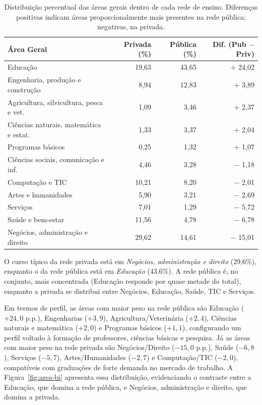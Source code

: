 \documentclass[12pt]{article}
\begin{document}
\begin{table}[h]
\centering
\small
\begin{tabular}{lrrr}
\toprule
Área Geral & Privada (\%) & Pública (\%) & Dif. (Pub $-$ Priv) \\
\midrule
Educação & 19,63 & 43,65 & $+$ 24,02 \\
Engenharia, produção e construção & 8,94 & 12,83 & $+$ 3,89 \\
Agricultura, silvicultura, pesca e vet. & 1,09 & 3,46 & $+$ 2,37 \\
Ciências naturais, matemática e estat. & 1,33 & 3,37 & $+$ 2,04 \\
Programas básicos & 0,25 & 1,32 & $+$ 1,07 \\
Ciências sociais, comunicação e inf. & 4,46 & 3,28 & $-$ 1,18 \\
Computação e TIC & 10,21 & 8,20 & $-$ 2,01 \\
Artes e humanidades & 5,90 & 3,21 & $-$ 2,69 \\
Serviços & 7,01 & 1,29 & $-$ 5,72 \\
Saúde e bem-estar & 11,56 & 4,78 & $-$ 6,78 \\
Negócios, administração e direito & 29,62 & 14,61 & $-$ 15,01 \\
\bottomrule
\end{tabular}
\caption{Distribuição percentual das áreas gerais dentro de cada rede de ensino. Diferenças positivas indicam áreas proporcionalmente mais presentes na rede pública; negativas, na privada.}
\label{tab:area-rede}
\end{table}

O curso típico da rede privada está em \textit{Negócios, administração e direito} (29,6\%), enquanto o da rede pública está em \textit{Educação} (43,6\%). A rede pública é, no conjunto, mais concentrada (Educação responde por quase metade do total), enquanto a privada se distribui entre Negócios, Educação, Saúde, TIC e Serviços.

Em termos de perfil, as áreas com maior peso na rede pública são Educação ($+24,0$ p.p.), Engenharias ($+3,9$), Agricultura/Veterinária ($+2,4$), Ciências naturais e matemática ($+2,0$) e Programas básicos ($+1,1$), configurando um perfil voltado à formação de professores, ciências básicas e pesquisa. Já as áreas com maior peso na rede privada são Negócios/Direito ($-15,0$ p.p.), Saúde ($-6,8$), Serviços ($-5,7$), Artes/Humanidades ($-2,7$) e Computação/TIC ($-2,0$), compatíveis com graduações de forte demanda no mercado de trabalho. A Figura~\ref{fig:area-bi} apresenta essa distribuição, evidenciando o contraste entre a Educação, que domina a rede pública, e Negócios, administração e direito, que domina a privada.
\end{document}
